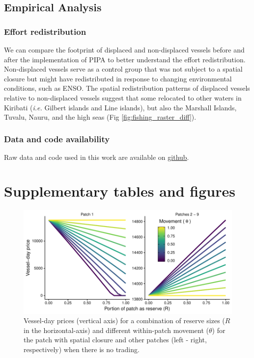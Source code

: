 \documentclass[12pt]{article}
\begin{document}
\subsection{Empirical Analysis}

\subsubsection{Effort redistribution}

We can compare the footprint of displaced and non-displaced vessels before and after the implementation of PIPA to better understand the effort redistribution. Non-displaced vessels serve as a control group that was not subject to a spatial closure but might have redistributed in response to changing environmental conditions, such as ENSO. The spatial redistribution patterns of displaced vessels relative to non-displaced vessels suggest that some relocated to other waters in Kiribati (\emph{i.e.} Gilbert islands and Line islands), but also the Marshall Islands, Tuvalu, Nauru, and the high seas (Fig \ref{fig:fishing_raster_diff}).

\subsubsection{Data and code availability}

Raw data and code used in this work are available on \href{https://github.com/jcvdav/MPA_displacement}{github}.

\clearpage

\FloatBarrier

\section{Supplementary tables and figures}

\begin{figure}[htbp]
\centering
\includegraphics{img/vessel_day_price_no_trading_plot.pdf}
\caption{\label{fig:vessel_day_price_no_trading_plot}Vessel-day prices (vertical axis) for a combination of reserve sizes ($R$ in the horizontal-axis) and different within-patch movement ($\theta$) for the patch with spatial closure and other patches (left - right, respectively) when there is no trading.}
\end{figure}
\end{document}
